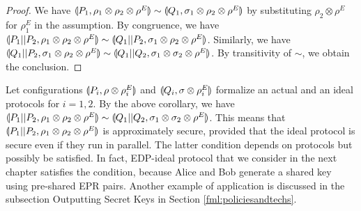 \begin{proof}
We have $\llparenthesis P_1, \rho_1 \otimes \rho_2 \otimes \rho^E \rrparenthesis
\sim \llparenthesis Q_1, \sigma_1 \otimes \rho_2 \otimes \rho^E \rrparenthesis$ by substituting
$\rho_2 \otimes \rho^E$ for $\rho^E_1$ in the assumption.
By congruence, we have $\llparenthesis P_1||P_2, \rho_1 \otimes \rho_2 \otimes \rho^E \rrparenthesis \sim
 \llparenthesis Q_1||P_2, \sigma_1 \otimes \rho_2 \otimes \rho^E \rrparenthesis$.
Similarly, we have $\llparenthesis Q_1||P_2, \sigma_1 \otimes \rho_2 \otimes \rho^E \rrparenthesis \sim
 \llparenthesis Q_1||Q_2, \sigma_1 \otimes \sigma_2 \otimes \rho^E \rrparenthesis$.
By transitivity of $\sim$, we obtain the conclusion.
\end{proof}
Let configurations $\llparenthesis P_i, \rho \otimes \rho^E_i \rrparenthesis$ and
$\llparenthesis Q_i, \sigma \otimes \rho^E_i \rrparenthesis$ formalize
an actual and an ideal protocols for $i = 1,2$.
By the above corollary, we have
$\llparenthesis P_1 || P_2, \rho_1 \otimes \rho_2 \otimes \rho^E \rrparenthesis \sim \llparenthesis Q_1 ||
 Q_2, \sigma_1 \otimes \sigma_2 \otimes \rho^E \rrparenthesis$.
This means that $\llparenthesis P_1 || P_2, \rho_1 \otimes \rho_2 \otimes \rho^E \rrparenthesis$
is approximately secure,
provided that the ideal protocol is secure even if they run in
parallel. The latter condition depends on protocols but possibly be
satisfied. In fact, EDP-ideal protocol that we consider in the next
chapter satisfies the condition, because Alice and Bob generate
a shared key using pre-shared EPR pairs.
Another example of application is discussed
in the subsection Outputting Secret Keys in Section
\ref{fml:policiesandtechs}.



